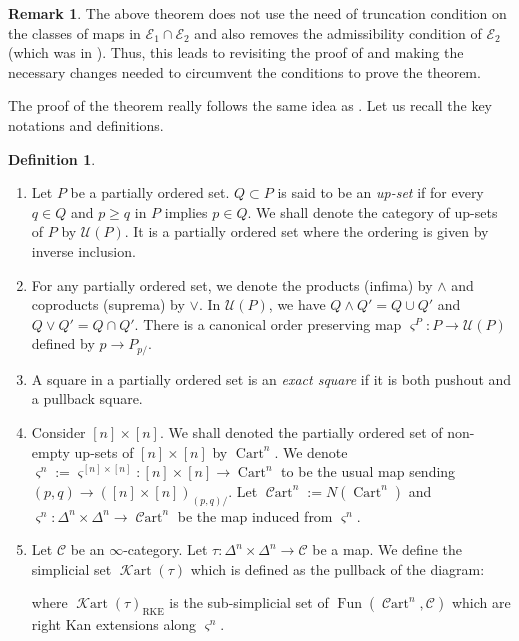 \documentclass[14pt]{article}
\theoremstyle{definition}
\newtheorem{definition}[theorem]{Definition}
\newtheorem{remark}[theorem]{Remark}
\newcommand{\E}{\mathcal{E}}
\newcommand{\K}{\mathcal{K}}
\newcommand{\op}[1]{\operatorname{#1}}
\newcommand{\C}{\mathcal{C}}
\newcommand{\U}{\mathcal{U}}
\newcommand{\Ca}{\mathcal{C}}
\numberwithin{subsection}{section}
\renewcommand{\U}{\mathcal{U}}
\newcommand{\Crt}{\op{Cart}}
\newcommand{\Cart}{\op{\C art}}
\newcommand{\Krt}{\op{\K art}}
\begin{document}
\begin{remark}
The above theorem does not use the need of truncation condition on the classes of maps in $\E_1 \cap \E_2$ and also removes the admissibility condition of $\E_2$ (which was in \cite[Thm B]{chowdhury2025sixfunctorformalismsii}). Thus, this leads to revisiting the proof of \cite[Thm B]{chowdhury2025sixfunctorformalismsii} and making the necessary changes needed to circumvent the conditions to prove the theorem.
\end{remark}
The proof of the theorem really follows the same idea as \cite[ThmB]{chowdhury2025sixfunctorformalismsii}. Let us recall the key notations and definitions.

\begin{definition}
    \begin{enumerate}
        \item 	Let $P$ be a partially ordered set. $Q \subset P$ is said to be an \textit{up-set} if for every $q \in Q$ and $ p \ge q $ in $P$ implies $ p \in Q$. We shall denote the category of up-sets of $P$ by $\U(P)$. It is a partially ordered set where the ordering is given by inverse inclusion. 
        \item 	For any partially ordered set, we denote the products (infima) by $ \wedge$ and coproducts (suprema) by $\vee$.  In $\U(P)$, we have $ Q \wedge Q' = Q \cup Q'$ and $ Q \vee Q' = Q \cap Q'$. There is a canonical order preserving map $\varsigma^P: P \to \U(P)$ defined by $p \to P_{p/}$. 
        \item A square in a partially ordered set is an \textit{exact square} if it is both pushout and a pullback square.
        \item Consider $[n] \times [n]$. We shall denoted the partially ordered set of non-empty up-sets of $[n] \times [n]$ by $\Crt^n$. We denote  $\varsigma^n:= \varsigma^{[n] \times [n]}: [n] \times [n] \to \Crt^n$ to be the usual map sending $(p,q) \to ([n] \times [n])_{(p,q)/}$. Let $\Cart^n:= N(\Crt^n)$ and $\varsigma^n: \Delta^n \times \Delta^n \to \Cart^n$ be the map induced from $\varsigma^n$.  
        \item Let $\Ca$ be an $\infty$-category. Let $\tau: \Delta^n \times \Delta^n \to  \Ca$ be a map. We define the simplicial set $\Krt(\tau)$ which is defined as the pullback of the diagram:
		
		\begin{center}
		\end{center}	
		where $\Krt(\tau)_{\op{RKE}}$ is the sub-simplicial set of $\op{Fun}(\Cart^n,\Ca)$ which are right Kan extensions along $\varsigma^n$. 
    \end{enumerate}
\end{definition}
\end{document}
